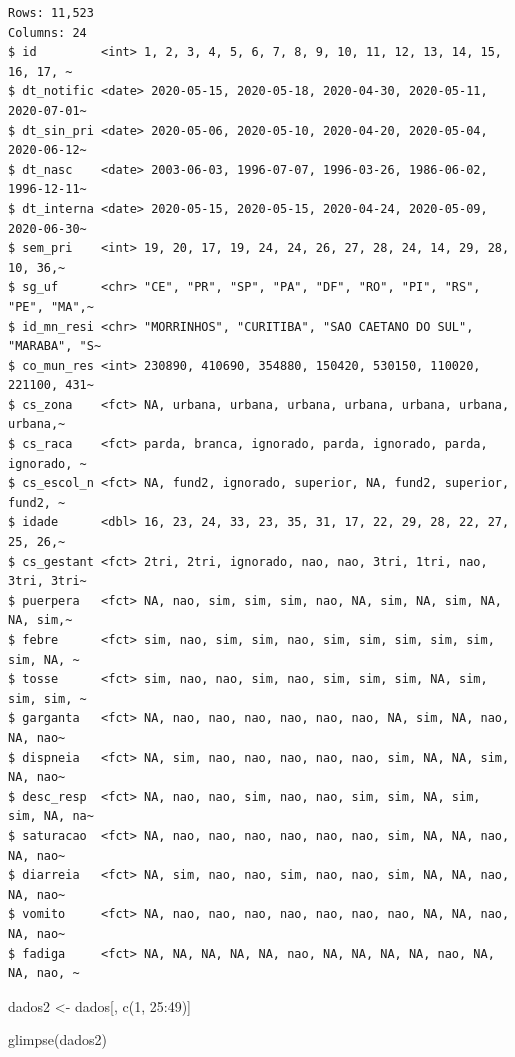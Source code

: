 \documentclass[
  letterpaper,
  DIV=11,
  numbers=noendperiod]{scrreprt}
\newenvironment{Shaded}{\begin{snugshade}}{\end{snugshade}}
\newcommand{\DecValTok}[1]{\textcolor[rgb]{0.68,0.00,0.00}{#1}}
\newcommand{\FunctionTok}[1]{\textcolor[rgb]{0.28,0.35,0.67}{#1}}
\newcommand{\NormalTok}[1]{\textcolor[rgb]{0.00,0.23,0.31}{#1}}
\newcommand{\OtherTok}[1]{\textcolor[rgb]{0.00,0.23,0.31}{#1}}
\newcommand{\SpecialCharTok}[1]{\textcolor[rgb]{0.37,0.37,0.37}{#1}}
\begin{document}
\begin{verbatim}
Rows: 11,523
Columns: 24
$ id         <int> 1, 2, 3, 4, 5, 6, 7, 8, 9, 10, 11, 12, 13, 14, 15, 16, 17, ~
$ dt_notific <date> 2020-05-15, 2020-05-18, 2020-04-30, 2020-05-11, 2020-07-01~
$ dt_sin_pri <date> 2020-05-06, 2020-05-10, 2020-04-20, 2020-05-04, 2020-06-12~
$ dt_nasc    <date> 2003-06-03, 1996-07-07, 1996-03-26, 1986-06-02, 1996-12-11~
$ dt_interna <date> 2020-05-15, 2020-05-15, 2020-04-24, 2020-05-09, 2020-06-30~
$ sem_pri    <int> 19, 20, 17, 19, 24, 24, 26, 27, 28, 24, 14, 29, 28, 10, 36,~
$ sg_uf      <chr> "CE", "PR", "SP", "PA", "DF", "RO", "PI", "RS", "PE", "MA",~
$ id_mn_resi <chr> "MORRINHOS", "CURITIBA", "SAO CAETANO DO SUL", "MARABA", "S~
$ co_mun_res <int> 230890, 410690, 354880, 150420, 530150, 110020, 221100, 431~
$ cs_zona    <fct> NA, urbana, urbana, urbana, urbana, urbana, urbana, urbana,~
$ cs_raca    <fct> parda, branca, ignorado, parda, ignorado, parda, ignorado, ~
$ cs_escol_n <fct> NA, fund2, ignorado, superior, NA, fund2, superior, fund2, ~
$ idade      <dbl> 16, 23, 24, 33, 23, 35, 31, 17, 22, 29, 28, 22, 27, 25, 26,~
$ cs_gestant <fct> 2tri, 2tri, ignorado, nao, nao, 3tri, 1tri, nao, 3tri, 3tri~
$ puerpera   <fct> NA, nao, sim, sim, sim, nao, NA, sim, NA, sim, NA, NA, sim,~
$ febre      <fct> sim, nao, sim, sim, nao, sim, sim, sim, sim, sim, sim, NA, ~
$ tosse      <fct> sim, nao, nao, sim, nao, sim, sim, sim, NA, sim, sim, sim, ~
$ garganta   <fct> NA, nao, nao, nao, nao, nao, nao, NA, sim, NA, nao, NA, nao~
$ dispneia   <fct> NA, sim, nao, nao, nao, nao, nao, sim, NA, NA, sim, NA, nao~
$ desc_resp  <fct> NA, nao, nao, sim, nao, nao, sim, sim, NA, sim, sim, NA, na~
$ saturacao  <fct> NA, nao, nao, nao, nao, nao, nao, sim, NA, NA, nao, NA, nao~
$ diarreia   <fct> NA, sim, nao, nao, sim, nao, nao, sim, NA, NA, nao, NA, nao~
$ vomito     <fct> NA, nao, nao, nao, nao, nao, nao, nao, NA, NA, nao, NA, nao~
$ fadiga     <fct> NA, NA, NA, NA, NA, nao, NA, NA, NA, NA, nao, NA, NA, nao, ~
\end{verbatim}

\begin{Shaded}
\begin{Highlighting}[]
\NormalTok{dados2 }\OtherTok{\textless{}{-}}\NormalTok{ dados[, }\FunctionTok{c}\NormalTok{(}\DecValTok{1}\NormalTok{, }\DecValTok{25}\SpecialCharTok{:}\DecValTok{49}\NormalTok{)]}

\FunctionTok{glimpse}\NormalTok{(dados2)}
\end{Highlighting}
\end{Shaded}
\end{document}
